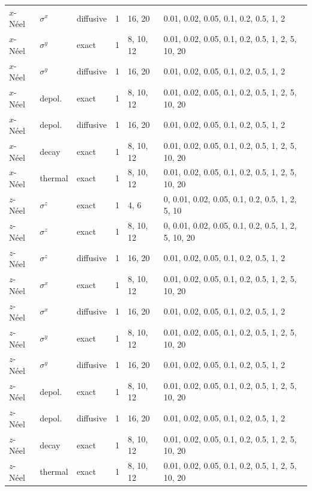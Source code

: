 \begin{center}
\begin{longtable}{lllcp{2.6cm}p{6.2cm}}
$x$-N\'eel & $\sigma^x$ & diffusive & 1 & 16, 20 & 0.01, 0.02, 0.05, 0.1, 0.2, 0.5, 1, 2 \\
$x$-N\'eel & $\sigma^y$ & exact & 1 & 8, 10, 12 & 0.01, 0.02, 0.05, 0.1, 0.2, 0.5, 1, 2, 5, 10, 20 \\
$x$-N\'eel & $\sigma^y$ & diffusive & 1 & 16, 20 & 0.01, 0.02, 0.05, 0.1, 0.2, 0.5, 1, 2 \\
$x$-N\'eel & depol. & exact & 1 & 8, 10, 12 & 0.01, 0.02, 0.05, 0.1, 0.2, 0.5, 1, 2, 5, 10, 20 \\
$x$-N\'eel & depol. & diffusive & 1 & 16, 20 & 0.01, 0.02, 0.05, 0.1, 0.2, 0.5, 1, 2 \\
$x$-N\'eel & decay & exact & 1 & 8, 10, 12 & 0.01, 0.02, 0.05, 0.1, 0.2, 0.5, 1, 2, 5, 10, 20 \\
$x$-N\'eel & thermal & exact & 1 & 8, 10, 12 & 0.01, 0.02, 0.05, 0.1, 0.2, 0.5, 1, 2, 5, 10, 20 \\
$z$-N\'eel & $\sigma^z$ & exact & 1 & 4, 6 & 0, 0.01, 0.02, 0.05, 0.1, 0.2, 0.5, 1, 2, 5, 10 \\
$z$-N\'eel & $\sigma^z$ & exact & 1 & 8, 10, 12 & 0, 0.01, 0.02, 0.05, 0.1, 0.2, 0.5, 1, 2, 5, 10, 20 \\
$z$-N\'eel & $\sigma^z$ & diffusive & 1 & 16, 20 & 0.01, 0.02, 0.05, 0.1, 0.2, 0.5, 1, 2 \\
$z$-N\'eel & $\sigma^x$ & exact & 1 & 8, 10, 12 & 0.01, 0.02, 0.05, 0.1, 0.2, 0.5, 1, 2, 5, 10, 20 \\
$z$-N\'eel & $\sigma^x$ & diffusive & 1 & 16, 20 & 0.01, 0.02, 0.05, 0.1, 0.2, 0.5, 1, 2 \\
$z$-N\'eel & $\sigma^y$ & exact & 1 & 8, 10, 12 & 0.01, 0.02, 0.05, 0.1, 0.2, 0.5, 1, 2, 5, 10, 20 \\
$z$-N\'eel & $\sigma^y$ & diffusive & 1 & 16, 20 & 0.01, 0.02, 0.05, 0.1, 0.2, 0.5, 1, 2 \\
$z$-N\'eel & depol. & exact & 1 & 8, 10, 12 & 0.01, 0.02, 0.05, 0.1, 0.2, 0.5, 1, 2, 5, 10, 20 \\
$z$-N\'eel & depol. & diffusive & 1 & 16, 20 & 0.01, 0.02, 0.05, 0.1, 0.2, 0.5, 1, 2 \\
$z$-N\'eel & decay & exact & 1 & 8, 10, 12 & 0.01, 0.02, 0.05, 0.1, 0.2, 0.5, 1, 2, 5, 10, 20 \\
$z$-N\'eel & thermal & exact & 1 & 8, 10, 12 & 0.01, 0.02, 0.05, 0.1, 0.2, 0.5, 1, 2, 5, 10, 20 \\
\bottomrule
\end{longtable}
\end{center}

